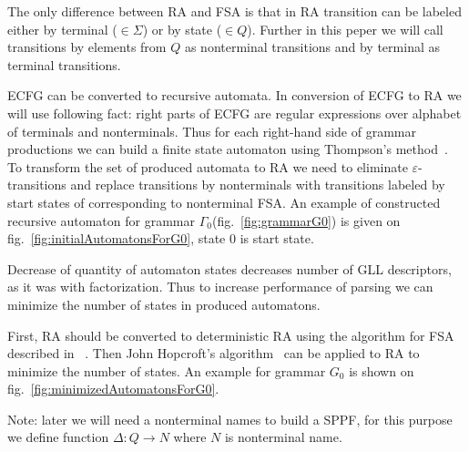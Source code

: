 \documentclass[runningheads,a4paper]{llncs}
\begin{document}
The only difference between RA and FSA is that in RA transition can be labeled either 
by terminal ($\in \Sigma$) or by state ($\in Q$). Further in this peper we will call
transitions by elements from $Q$ as nonterminal transitions and by terminal as terminal transitions.

ECFG can be converted to recursive automata.
In conversion of ECFG to RA we will use following fact: 
right parts of ECFG are regular expressions over alphabet of terminals and nonterminals.
Thus for each right-hand side of grammar productions we can build a finite state automaton 
using Thompson's method~\cite{Thompson:1968:PTR:363347.363387}. 
To transform the set of produced automata to RA we need to eliminate $\varepsilon$-transitions and replace
transitions by nonterminals with transitions labeled by start states of corresponding to nonterminal FSA.
An example of constructed recursive automaton for grammar $\Gamma_{0}$(fig.~\ref{fig:grammarG0})
is given on fig.~\ref{fig:initialAutomatonsForG0}, state 0 is start state.

Decrease of quantity of automaton states decreases number of GLL descriptors, as it was with factorization.
Thus to increase performance of parsing we can minimize the number of states in produced automatons.

First, RA should be converted to deterministic RA using the algorithm for FSA described in ~\cite{aho1974design}.
Then John Hopcroft's algorithm~\cite{hopcroft1971n} can be applied to RA to minimize the number of states.
An example for grammar $G_0$ is shown on fig.~\ref{fig:minimizedAutomatonsForG0}.

Note: later we will need a nonterminal names to build a SPPF, for this purpose we define function $\Delta : Q \to N$ where $N$
is nonterminal name.
\end{document}
